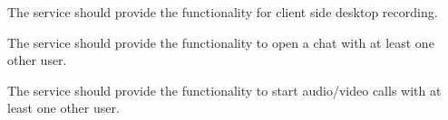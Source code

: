\documentclass[8pt]{beamer}
\begin{document}
\begin{frame}
The service should provide the functionality for client side desktop recording.
\end{frame}
\begin{frame}
The service should provide the functionality to open a chat with at least one other user.
\end{frame}
\begin{frame}
The service should provide the functionality to start audio/video calls with at least one other user.
\end{frame}
\end{document}
